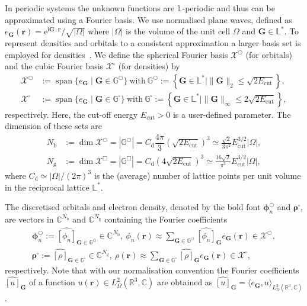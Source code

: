 \documentclass[hidelinks,onefignum,onetabnum]{siamart250211}
\newcommand{\R}{\mathbb{R}}
\newcommand{\C}{\mathbb{C}}
\newcommand{\e}{\mathrm{e}}
\newcommand{\im}{\mathrm{i}}
\newcommand{\spann}{\operatorname{span}}
\newcommand{\La}{\mathbb{L}}
\newcommand{\Ecut}{E_{\mathrm{cut}}}
\newcommand{\G}{\mathbb{G}}
\newcommand{\Nb}{N_{\mathrm{b}}}
\newcommand{\Ng}{N_{\mathrm{g}}}
\newcommand{\Cd}{C_{\mathrm{d}}}
\newcommand{\abs}[1]{\left\vert #1 \right\vert}
\begin{document}
In periodic systems the unknown functions are $\La$-periodic and
thus can be approximated using a Fourier basis.
We use normalised plane waves, defined as
$e_{\bm G}(\bm r) = \e^{\im \bm G \cdot \bm r} / \sqrt{|\Omega|}$ where $|\Omega|$
is the volume of the unit cell $\Omega$ and $\bm G \in \La^*$.
To represent densities and orbitals to a consistent approximation
a larger basis set is employed for densities~\cite{cances2022planewave,lin2019KSDFT}.
We define the spherical Fourier basis $\mathcal{X}^{\bigcirc}$ (for orbitals)
and the cubic Fourier basis $\mathcal{X}^{\square}$ (for densities) by
\begin{equation}
    \label{eqn:fourier_bases}
  \begin{aligned}
    \mathcal{X}^{\bigcirc}&:= \spann \{ e_{\bm G} \mid \bm G \in \G^{\bigcirc} \} \ \text{with} \ \G^{\bigcirc} := \left\{ \bm G \in \La^* \mid \|\bm G\|_2 \leq \sqrt{2\Ecut} \right\},\\
    \mathcal{X}^{\square}&:= \spann \{ e_{\bm G} \mid \bm G \in \G^{\square} \} \ \text{with} \ \G^{\square} := \left\{ \bm G \in \La^* \mid \|\bm G\|_{\infty} \leq 2\sqrt{2\Ecut} \right\},
  \end{aligned}
\end{equation}
respectively. Here, the cut-off energy $\Ecut > 0$ is a user-defined parameter.
The dimension of these sets are
\begin{equation}\label{eq:Nb_Ng_definition}
  \begin{aligned}
    \Nb &:= \dim \mathcal{X}^{\bigcirc} = \left| \G^{\bigcirc} \right| = \Cd \dfrac{4 \pi}{3} \left( \sqrt{2\Ecut} \right)^3 \simeq \frac{\sqrt{2}}{3\pi^2} \Ecut^{3/2} \abs{\Omega}, \\
    \Ng &:= \dim \mathcal{X}^{\Box} = \left| \G^{\Box} \right| = \Cd \left( 4 \sqrt{2\Ecut} \right)^3 \simeq \frac{16\sqrt{2}}{\pi^3} \Ecut^{3/2} \abs{\Omega},
  \end{aligned}
\end{equation}
where $\Cd \simeq |\Omega|/(2\pi)^3$ is the (average) number of lattice points per unit volume in the reciprocal lattice $\La^*$. 

The discretised orbitals and electron density, denoted by the bold font $\bm \phi_n^{\bigcirc}$ and $\bm \rho^{\square}$, are vectors in $\C^{\Nb}$ and $\C^{\Ng}$ containing the Fourier coefficients
\begin{equation}
  \begin{gathered}
    \bm \phi_n^{\bigcirc} := \widehat{[\phi_n]}_{\bm G \in \G^{\bigcirc}} \in \C^{\Nb}, \ \phi_n(\bm r) \approx \sum_{\bm G \in \G^{\bigcirc}} \widehat{[\phi_{n}]}_{\bm G} e_{\bm G}(\bm r)\in \mathcal{X}^{\bigcirc}, \\
    \bm \rho^{\square} := \widehat{[\rho]}_{\bm G \in \G^{\square}} \in \C^{\Ng}, \ \rho(\bm r) \approx \sum_{\bm G \in \G^{\square}} \widehat{[\rho]}_{\bm G} e_{\bm G}(\bm r)\in \mathcal{X}^{\square},
  \end{gathered}
\end{equation}
respectively. Note that with our normalisation convention
the Fourier coefficients $\widehat{[u]}_{\bm G}$ of a function
$u(\bm r) \in L^2_{\Omega}(\R^3, \C)$ are obtained as
$\widehat{[u]}_{\bm G} = \langle e_{\bm G}, u \rangle_{L^2_{\Omega}(\R^3, \C)}$.
%
%
%
\end{document}
